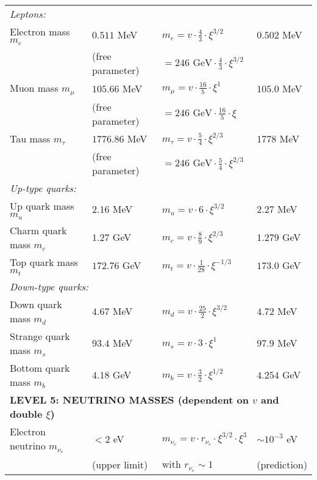 \documentclass[12pt,a4paper]{article}
\begin{document}
\begin{longtable}{p{5cm}p{4cm}p{3.5cm}p{3.5cm}}
	\multicolumn{4}{l}{\textit{Leptons:}} \\
	
	Electron mass $m_e$ & $0.511$ MeV & $m_e = v \cdot \frac{4}{3} \cdot \xi^{3/2}$ & $0.502$ MeV \\
	& (free parameter) & $= 246 \text{ GeV} \cdot \frac{4}{3} \cdot \xi^{3/2}$ & \\[0.3em]
	
	Muon mass $m_\mu$ & $105.66$ MeV & $m_\mu = v \cdot \frac{16}{5} \cdot \xi^1$ & $105.0$ MeV \\
	& (free parameter) & $= 246 \text{ GeV} \cdot \frac{16}{5} \cdot \xi$ & \\[0.3em]
	
	Tau mass $m_\tau$ & $1776.86$ MeV & $m_\tau = v \cdot \frac{5}{4} \cdot \xi^{2/3}$ & $1778$ MeV \\
	& (free parameter) & $= 246 \text{ GeV} \cdot \frac{5}{4} \cdot \xi^{2/3}$ & \\[0.3em]
	
	\multicolumn{4}{l}{\textit{Up-type quarks:}} \\
	
	Up quark mass $m_u$ & $2.16$ MeV & $m_u = v \cdot 6 \cdot \xi^{3/2}$ & $2.27$ MeV \\
	
	Charm quark mass $m_c$ & $1.27$ GeV & $m_c = v \cdot \frac{8}{9} \cdot \xi^{2/3}$ & $1.279$ GeV \\
	
	Top quark mass $m_t$ & $172.76$ GeV & $m_t = v \cdot \frac{1}{28} \cdot \xi^{-1/3}$ & $173.0$ GeV \\
	
	\multicolumn{4}{l}{\textit{Down-type quarks:}} \\
	
	Down quark mass $m_d$ & $4.67$ MeV & $m_d = v \cdot \frac{25}{2} \cdot \xi^{3/2}$ & $4.72$ MeV \\
	
	Strange quark mass $m_s$ & $93.4$ MeV & $m_s = v \cdot 3 \cdot \xi^1$ & $97.9$ MeV \\
	
	Bottom quark mass $m_b$ & $4.18$ GeV & $m_b = v \cdot \frac{3}{2} \cdot \xi^{1/2}$ & $4.254$ GeV \\
	
	\midrule
	\multicolumn{4}{l}{\textbf{LEVEL 5: NEUTRINO MASSES (dependent on $v$ and double $\xi$)}} \\
	\midrule
	
	Electron neutrino $m_{\nu_e}$ & $< 2$ eV & $m_{\nu_e} = v \cdot r_{\nu_e} \cdot \xi^{3/2} \cdot \xi^3$ & $\sim 10^{-3}$ eV \\
	& (upper limit) & with $r_{\nu_e} \sim 1$ & (prediction) \\[0.3em]
	

\end{longtable}
\end{document}
